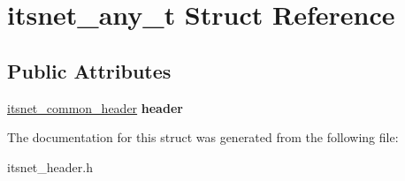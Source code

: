 \hypertarget{structitsnet__any__t}{\section{itsnet\-\_\-any\-\_\-t \-Struct \-Reference}
\label{structitsnet__any__t}
}
\subsection*{\-Public \-Attributes}
\begin{DoxyCompactItemize}
\item 
\hypertarget{structitsnet__any__t_a9cd96adfd53166cd2574453e0e9f3d69}{\hyperlink{structitsnet__common__header}{itsnet\-\_\-common\-\_\-header} {\bfseries header}}\label{structitsnet__any__t_a9cd96adfd53166cd2574453e0e9f3d69}

\end{DoxyCompactItemize}


\-The documentation for this struct was generated from the following file\-:\begin{DoxyCompactItemize}
\item 
itsnet\-\_\-header.\-h\end{DoxyCompactItemize}
